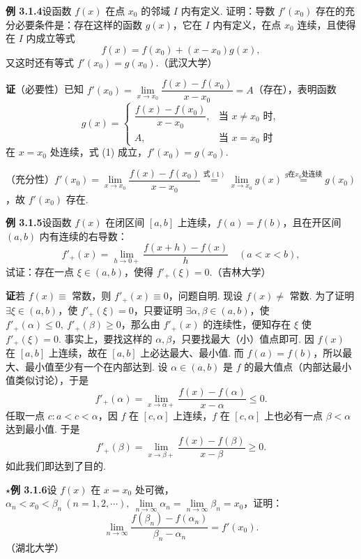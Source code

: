 \documentclass[UTF8, 12pt, fontset=fandol, oneside]{ctexart}
\begin{document}
\noindent\textbf{例 3.1.4}\quad 设函数 $f(x)$ 在点 $x_0$ 的邻域 $I$ 内有定义. 证明：导数 $f'(x_0)$ 存在的充分必要条件是：存在这样的函数 $g(x)$，它在 $I$ 内有定义，在点 $x_0$ 连续，且使得在 $I$ 内成立等式
\begin{equation}
  f(x)=f(x_0)+(x-x_0)g(x),
\tag{1}
\end{equation}
又这时还有等式 $f'(x_0)=g(x_0)$.（武汉大学）

\noindent\textbf{证}\quad （必要性）已知 $f'(x_0)=\lim\limits_{x\to x_0}\dfrac{f(x)-f(x_0)}{x-x_0}=A$（存在），表明函数
\[
g(x)=
\begin{cases}
\dfrac{f(x)-f(x_0)}{x-x_0}, & \text{当 }x\ne x_0\text{ 时},\\
A, & \text{当 }x=x_0\text{ 时}
\end{cases}
\]
在 $x=x_0$ 处连续，式 (1) 成立，$f'(x_0)=g(x_0)$.

（充分性）$f'(x_0)=\lim\limits_{x\to x_0}\dfrac{f(x)-f(x_0)}{x-x_0}\stackrel{\text{式}(1)}{=}\lim\limits_{x\to x_0}g(x)\stackrel{g\text{在}x_0\text{处连续}}{=}g(x_0)$，故 $f'(x_0)$ 存在.

\noindent\textbf{例 3.1.5}\quad 设函数 $f(x)$ 在闭区间 $[a,b]$ 上连续，$f(a)=f(b)$，且在开区间 $(a,b)$ 内有连续的右导数：
\[
  f'_+(x)=\lim_{h\to0+}\frac{f(x+h)-f(x)}h\quad(a<x<b),
\]
试证：存在一点 $\xi\in(a,b)$，使得 $f'_+(\xi)=0$.（吉林大学）

\noindent\textbf{证}\quad 若 $f(x)\equiv$ 常数，则 $f'_+(x)\equiv0$，问题自明. 现设 $f(x)\ne$ 常数. 为了证明 $\exists \xi\in(a,b)$，使 $f'_+(\xi)=0$，只要证明 $\exists \alpha,\beta\in(a,b)$，使 $f'_+(\alpha)\le0,\ f'_+(\beta)\ge0$，那么由 $f'_+(x)$ 的连续性，便知存在 $\xi$ 使 $f'_+(\xi)=0$. 事实上，要找这样的 $\alpha,\beta$，只要找最大（小）值点即可. 因 $f(x)$ 在 $[a,b]$ 上连续，故在 $[a,b]$ 上必达最大、最小值. 而 $f(a)=f(b)$，所以最大、最小值至少有一个在内部达到. 设 $\alpha\in(a,b)$ 是 $f$ 的最大值点（内部达最小值类似讨论），于是
\[
  f'_+(\alpha)=\lim_{x\to\alpha+}\frac{f(x)-f(\alpha)}{x-\alpha}\le0.
\]
任取一点 $c:a<c<\alpha$，因 $f$ 在 $[c,\alpha]$ 上连续，$f$ 在 $[c,\alpha]$ 上也必有一点 $\beta<\alpha$ 达到最小值. 于是
\[
  f'_+(\beta)=\lim_{x\to\beta+}\frac{f(x)-f(\beta)}{x-\beta}\ge0.
\]
如此我们即达到了目的.

\noindent\textbf{$\star$例 3.1.6}\quad 设 $f(x)$ 在 $x=x_0$ 处可微，$\alpha_n<x_0<\beta_n\ (n=1,2,\cdots),\ \lim\limits_{n\to\infty}\alpha_n=\lim\limits_{n\to\infty}\beta_n=x_0$，证明：
\[
  \lim_{n\to\infty}\frac{f(\beta_n)-f(\alpha_n)}{\beta_n-\alpha_n}=f'(x_0).
\]
（湖北大学）
\end{document}

